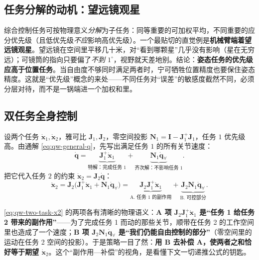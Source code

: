\subsection{任务分解的动机：望远镜观星}
\label{subsec:qw-telescope}

\begin{insight}\label{ins:qw-telescope}
综合控制任务可按物理意义\emph{分解}为子任务：同等重要的可加权平均，不同重要的应分优先级（且低优先级\emph{不应}影响高优先级）。一个最贴切的直觉例是\textbf{机械臂端着望远镜观星}。望远镜在空间里平移几十米，对“看到哪颗星”几乎没有影响（星在无穷远）；可镜筒的指向只要偏了\emph{不到 $1^\circ$}，视野就天差地别。结论：\textbf{姿态任务的优先级应高于位置任务}。当自由度不够同时满足两者时，宁可牺牲位置精度也要保住姿态精度。这就是“优先级”概念的来处——不同任务对“误差”的敏感度截然不同，必须分层对待，而不是一锅端进一个加权和里。
\end{insight}

\subsection{双任务全身控制}
\label{subsec:qw-two-task}

设两个任务 $\dot{\boldsymbol{x}}_1,\dot{\boldsymbol{x}}_2$，雅可比 $\boldsymbol{J}_1,\boldsymbol{J}_2$，零空间投影 $\boldsymbol{N}_1=\mathbf{I}-\boldsymbol{J}_1^+\boldsymbol{J}_1$，任务 $1$ 优先级高。由通解 \cref{eq:qw-general-q}，先写出满足任务 $1$ 的所有关节速度\cite{yu2021quadruped}：
\begin{equation}
  \dot{\boldsymbol{q}}=\underbrace{\boldsymbol{J}_1^+\dot{\boldsymbol{x}}_1}_{\text{特解：完成任务 1}}
  +\underbrace{\boldsymbol{N}_1\dot{\boldsymbol{q}}_{\forall}}_{\text{齐次解：不影响任务 1}}.
  \label{eq:qw-two-task-q}
\end{equation}
把它代入任务 $2$ 的约束 $\dot{\boldsymbol{x}}_2=\boldsymbol{J}_2\dot{\boldsymbol{q}}$：
\begin{equation}
  \dot{\boldsymbol{x}}_2=\boldsymbol{J}_2\big(\boldsymbol{J}_1^+\dot{\boldsymbol{x}}_1+\boldsymbol{N}_1\dot{\boldsymbol{q}}_{\forall}\big)
  =\underbrace{\boldsymbol{J}_2\boldsymbol{J}_1^+\dot{\boldsymbol{x}}_1}_{\text{A. 任务 1 的副作用}}
  +\underbrace{\boldsymbol{J}_2\boldsymbol{N}_1\dot{\boldsymbol{q}}_{\forall}}_{\text{B. 可控部分}}.
  \label{eq:qw-two-task-x2}
\end{equation}

\begin{insight}\label{ins:qw-side-effect}
\cref{eq:qw-two-task-x2} 的两项各有清晰的物理语义：\textbf{A 项 $\boldsymbol{J}_2\boldsymbol{J}_1^+\dot{\boldsymbol{x}}_1$ 是“任务 1 给任务 2 带来的副作用”}——为了完成任务 1 而动的那些关节，顺带在任务 2 的工作空间里也造成了一个速度；\textbf{B 项 $\boldsymbol{J}_2\boldsymbol{N}_1\dot{\boldsymbol{q}}_{\forall}$ 是“我们仍能自由控制的部分”}（零空间里的运动在任务 2 空间的投影）。于是策略一目了然：\textbf{用 B 去补偿 A，使两者之和恰好等于期望 $\dot{\boldsymbol{x}}_2$}。这个“副作用—补偿”的视角，是看懂下文一切递推公式的钥匙。
\end{insight}

